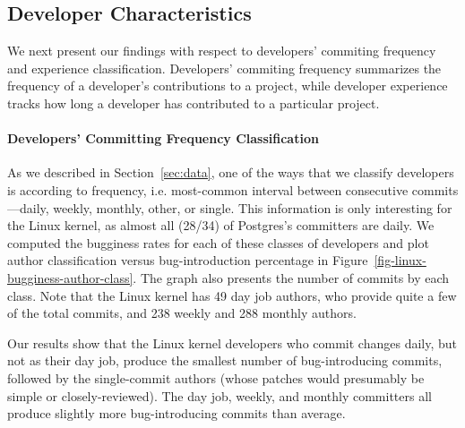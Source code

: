 

\subsection{Developer Characteristics}
We next present our findings with respect to developers' commiting 
frequency and experience classification. Developers'
commiting frequency summarizes the frequency of
a developer's contributions to a project, while developer experience
tracks how long a developer has contributed to a particular project.

\paragraph{Developers' Committing Frequency Classification} 
As we described in Section~\ref{sec:data}, one of the ways that we
classify developers is according to frequency, i.e. most-common
interval between consecutive commits---daily, weekly, monthly, other,
or single.  This information is only interesting for the Linux kernel,
as almost all (28/34) of Postgres's committers are daily. We computed
the bugginess rates for each of these classes of developers and plot
author classification versus bug-introduction percentage in
Figure~\ref{fig-linux-bugginess-author-class}. The graph also presents
the number of commits by each class. Note that the Linux kernel has 49
day job authors, who provide quite a few of the total commits, and 238
weekly and 288 monthly authors.

Our results show that the Linux kernel developers who commit changes daily, but
not as their day job, produce the smallest number of bug-introducing
commits, followed by the single-commit authors (whose patches would
presumably be simple or closely-reviewed). The day job, weekly, and
monthly committers all produce slightly more bug-introducing commits
than average.

